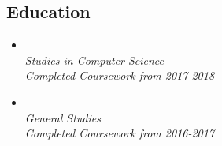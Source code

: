 \documentclass[10pt,oneside,a4paper,titlepage]{article}
\begin{document}
\begin{tcolorbox}
\begin{minipage}[t]{10cm}
\begin{tcolorbox}[grow to right by=1cm,colframe=white,colback=white]
      \vspace{-0.6cm}
      \section*{Education}
      \vspace{-0.2cm}
      \begin{itemize}[]
        \item{
            {}\\
            \emph{Studies in Computer Science}\\
            \emph{Completed Coursework from 2017-2018}
          }
        \item{
            {}\\
            \emph{General Studies}\\
            \emph{Completed Coursework from 2016-2017}
          }
      \end{itemize}
    \end{tcolorbox}
  \end{minipage}
\end{tcolorbox}
\end{document}
